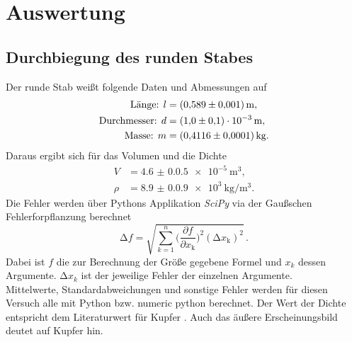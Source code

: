 \section{Auswertung}
\label{sec:Auswertung}
\subsection{Durchbiegung des runden Stabes}
Der runde Stab weißt folgende Daten und Abmessungen auf
\begin{align*}
    \text{Länge: } l&=\qty{0,589(0.001)}{\meter},\\
    \text{Durchmesser: } d&=\qty{1,0(0,1)e-3}{\meter},\\
    \text{Masse: } m&=\qty{0,4116(0.0001)}{\kilo\gram}.
\end{align*}
Daraus ergibt sich für das Volumen und die Dichte 
\begin{align*}
    V&=\qty{4.6(0.05)e-5}{\meter\cubed},\\
    \rho&=\qty{8.9(0.09)e3}{\kilo\gram\per\meter\cubed}.
\end{align*}
Die Fehler werden über Pythons Applikation \textit{SciPy} via der Gaußschen 
Fehlerforpflanzung berechnet
\begin{equation}
    \increment f=\sqrt{\sum_{k=1}^{n}\biggl(\frac{\partial f}{\partial x_\text{k}}\biggr)^2(\increment x_\text{k})^2}\,.
    \label{eq:gauss}
    \end{equation}
Dabei ist $f$ die zur Berechnung der Größe gegebene Formel und $x_k$ dessen Argumente.
$\increment x_k$ ist der jeweilige Fehler der einzelnen Argumente.\\ 
Mittelwerte, Standardabweichungen und sonstige Fehler werden für diesen Versuch alle mit Python bzw. 
numeric python berechnet. \noindent 
Der Wert der Dichte entspricht dem Literaturwert für Kupfer \cite{Kupfer}. 
Auch das äußere Erscheinungsbild deutet auf Kupfer hin.
